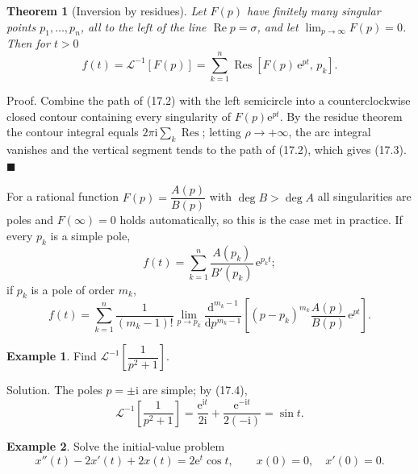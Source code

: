 \documentclass[11pt,a4paper]{article}
\theoremstyle{definition}
\newtheorem{example}{Example}[section]
\theoremstyle{plain}
\newtheorem{theorem}{Theorem}[section]
\begin{document}
\begin{theorem}[Inversion by residues]
Let $F(p)$ have finitely many singular points $p_1,\dots,p_n$, all to the left of the line
$\operatorname{Re}p=\sigma$, and let $\lim_{p\to\infty}F(p)=0$. Then for $t>0$
\begin{equation}
f(t)=\mathcal{L}^{-1}\left[F(p)\right]
=\sum_{k=1}^{n}\operatorname{Res}\left[F(p)\,\mathrm{e}^{pt},\,p_k\right]. \tag{17.3}
\end{equation}
\end{theorem}

Proof. Combine the path of (17.2) with the left semicircle into a counterclockwise closed
contour containing every singularity of $F(p)\mathrm{e}^{pt}$. By the residue theorem the contour
integral equals $2\pi\mathrm{i}\sum_{k}\operatorname{Res}$; letting $\rho\to+\infty$, the arc
integral vanishes and the vertical segment tends to the path of (17.2), which gives (17.3).
\hfill$\blacksquare$

For a rational function $F(p)=\dfrac{A(p)}{B(p)}$ with $\deg B>\deg A$ all singularities are poles
and $F(\infty)=0$ holds automatically, so this is the case met in practice. If every $p_k$ is a
simple pole,
\begin{equation}
f(t)=\sum_{k=1}^{n}\frac{A(p_k)}{B'(p_k)}\,\mathrm{e}^{p_k t} ; \tag{17.4}
\end{equation}
if $p_k$ is a pole of order $m_k$,
\begin{equation}
f(t)=\sum_{k=1}^{n}\frac{1}{(m_k-1)!}\lim_{p\to p_k}\frac{\mathrm{d}^{m_k-1}}
{\mathrm{d}p^{m_k-1}}\left[(p-p_k)^{m_k}\frac{A(p)}{B(p)}\,\mathrm{e}^{pt}\right]. \tag{17.5}
\end{equation}

\begin{samepage}
\begin{example}
Find $\mathcal{L}^{-1}\left[\dfrac{1}{p^2+1}\right]$.
\end{example}

Solution. The poles $p=\pm\mathrm{i}$ are simple; by (17.4),
\begin{equation*}
\mathcal{L}^{-1}\left[\frac{1}{p^2+1}\right]
=\frac{\mathrm{e}^{\mathrm{i}t}}{2\mathrm{i}}+\frac{\mathrm{e}^{-\mathrm{i}t}}{2(-\mathrm{i})}
=\sin t .
\end{equation*}
\end{samepage}

\begin{example}
Solve the initial-value problem
\begin{equation*}
x''(t)-2x'(t)+2x(t)=2\mathrm{e}^{t}\cos t,\qquad x(0)=0,\quad x'(0)=0 .
\end{equation*}
\end{example}
\end{document}
